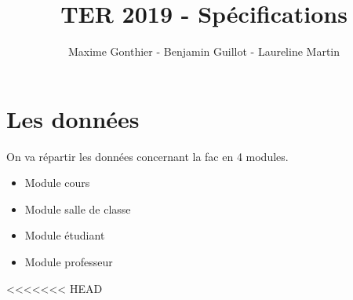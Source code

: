 \documentclass[a4paper,11pt]{article}
\title{TER 2019 - Spécifications}
\author{Maxime Gonthier - Benjamin Guillot - Laureline Martin}
\begin{document}
	\clearpage
	\maketitle

\newpage
\tableofcontents

\newpage
\section{Les données}
	On va répartir les données concernant la fac en 4 modules.\\
	\begin{itemize}
		\item Module cours
		\item Module salle de classe
		\item Module étudiant
		\item Module professeur
	\end{itemize}
<<<<<<< HEAD
\end{document}
